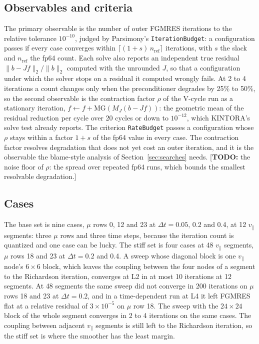 \documentclass[11pt]{article}
\newcommand{\todo}[1]{\textcolor{red!70!black}{\small[\textbf{TODO:} #1]}}
\newcommand{\vpar}{v_\parallel}
\newcommand{\code}[1]{\texttt{#1}}
\begin{document}
\subsection{Observables and criteria}
\label{sec:observables}
The primary observable is the number of outer FGMRES iterations to the relative tolerance
$10^{-10}$, judged by Parsimony's \code{IterationBudget}: a configuration passes if every case
converges within $\lceil (1 + s)\, n_\mathrm{ref} \rceil$ iterations, with $s$ the slack and
$n_\mathrm{ref}$ the fp64 count.  Each solve also reports an independent true residual
$\|b - J f\|_2 / \|b\|_2$ computed with the unrounded $J$, so that a configuration under which
the solver stops on a residual it computed wrongly fails.  At 2 to 4 iterations a count
changes only when the preconditioner degrades by 25\% to 50\%, so the second observable is the
contraction factor $\rho$ of the V-cycle run as a stationary iteration,
$f \leftarrow f + \mathrm{MG}(M_J (b - J f))$: the geometric mean of the residual reduction per
cycle over 20 cycles or down to $10^{-12}$, which KINTORA's solve test already reports.  The
criterion \code{RateBudget} passes a configuration whose $\rho$ stays within a factor $1 + s$ of
the fp64 value in every case.  The contraction factor resolves degradation that does not yet
cost an outer iteration, and it is the observable the blame-style analysis of
Section~\ref{sec:searches} needs.
\todo{the noise floor of $\rho$: the spread over repeated fp64 runs, which bounds the smallest
resolvable degradation.}

\subsection{Cases}
\label{sec:cases}
The base set is nine cases, $\mu$ rows 0, 12 and 23 at $\Delta t = 0.05$, 0.2 and 0.4, at 12
$\vpar$ segments: three $\mu$ rows and three time steps, because the iteration count is
quantized and one case can be lucky.  The stiff set is four cases at 48 $\vpar$ segments,
$\mu$ rows 18 and 23 at $\Delta t = 0.2$ and 0.4.  A sweep whose diagonal block is one $\vpar$
node's $6 \times 6$ block, which leaves the coupling between the four nodes of a segment to the
Richardson iteration, converges at L2 in at most 10 iterations at 12 segments.  At 48 segments
the same sweep did not converge in 200 iterations on $\mu$ rows 18 and 23 at $\Delta t = 0.2$, and
in a time-dependent run at L4 it left FGMRES flat at a relative residual of $3 \times 10^{-5}$ on
$\mu$ row 18.  The sweep with the $24 \times 24$ block of the whole segment converges in 2 to 4
iterations on the same cases.
The coupling between adjacent $\vpar$ segments is still left to the Richardson iteration, so the
stiff set is where the smoother has the least margin.
\end{document}
